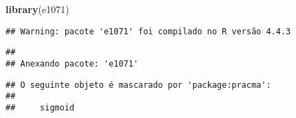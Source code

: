 \documentclass[
]{article}
\newenvironment{Shaded}{\begin{snugshade}}{\end{snugshade}}
\newcommand{\FunctionTok}[1]{\textcolor[rgb]{0.13,0.29,0.53}{\textbf{#1}}}
\newcommand{\NormalTok}[1]{#1}
\begin{document}
\begin{Shaded}
\begin{Highlighting}[]
\FunctionTok{library}\NormalTok{(e1071)}
\end{Highlighting}
\end{Shaded}

\begin{verbatim}
## Warning: pacote 'e1071' foi compilado no R versão 4.4.3
\end{verbatim}

\begin{verbatim}
## 
## Anexando pacote: 'e1071'
\end{verbatim}

\begin{verbatim}
## O seguinte objeto é mascarado por 'package:pracma':
## 
##     sigmoid
\end{verbatim}
\end{document}
